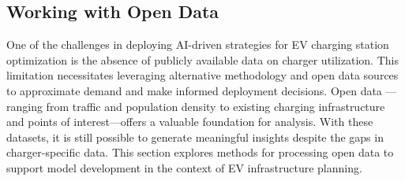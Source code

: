 \subsection{Working with Open Data}
One of the challenges in deploying AI-driven strategies for EV charging station optimization is the absence of publicly available data on charger utilization. This limitation necessitates leveraging alternative methodology and open data sources to approximate demand and make informed deployment decisions. Open data — ranging from traffic and population density to existing charging infrastructure and points of interest—offers a valuable foundation for analysis. With these datasets, it is still possible to generate meaningful insights despite the gaps in charger-specific data. This section explores methods for processing open data to support model development in the context of EV infrastructure planning.
